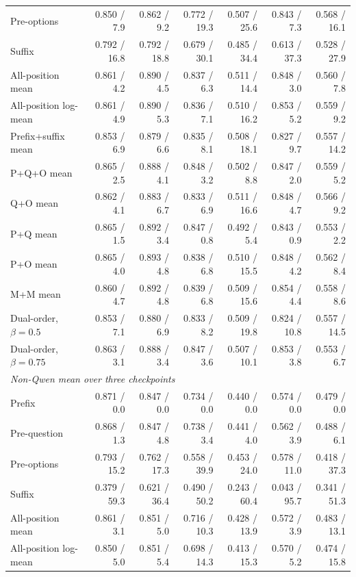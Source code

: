 \begin{tabular}{lrrrrrr}
Pre-options & 0.850 / 7.9 & 0.862 / 9.2 & 0.772 / 19.3 & 0.507 / 25.6 & 0.843 / 7.3 & 0.568 / 16.1 \\
Suffix & 0.792 / 16.8 & 0.792 / 18.8 & 0.679 / 30.1 & 0.485 / 34.4 & 0.613 / 37.3 & 0.528 / 27.9 \\
All-position mean & 0.861 / 4.2 & 0.890 / 4.5 & 0.837 / 6.3 & 0.511 / 14.4 & 0.848 / 3.0 & 0.560 / 7.8 \\
All-position log-mean & 0.861 / 4.9 & 0.890 / 5.3 & 0.836 / 7.1 & 0.510 / 16.2 & 0.853 / 5.2 & 0.559 / 9.2 \\
Prefix+suffix mean & 0.853 / 6.9 & 0.879 / 6.6 & 0.835 / 8.1 & 0.508 / 18.1 & 0.827 / 9.7 & 0.557 / 14.2 \\
P+Q+O mean & 0.865 / 2.5 & 0.888 / 4.1 & 0.848 / 3.2 & 0.502 / 8.8 & 0.847 / 2.0 & 0.559 / 5.2 \\
Q+O mean & 0.862 / 4.1 & 0.883 / 6.7 & 0.833 / 6.9 & 0.511 / 16.6 & 0.848 / 4.7 & 0.566 / 9.2 \\
P+Q mean & 0.865 / 1.5 & 0.892 / 3.4 & 0.847 / 0.8 & 0.492 / 5.4 & 0.843 / 0.9 & 0.553 / 2.2 \\
P+O mean & 0.865 / 4.0 & 0.893 / 4.8 & 0.838 / 6.8 & 0.510 / 15.5 & 0.848 / 4.2 & 0.562 / 8.4 \\
M+M mean & 0.860 / 4.7 & 0.892 / 4.8 & 0.839 / 6.8 & 0.509 / 15.6 & 0.854 / 4.4 & 0.558 / 8.6 \\
Dual-order, $\beta{=}0.5$ & 0.853 / 7.1 & 0.880 / 6.9 & 0.833 / 8.2 & 0.509 / 19.8 & 0.824 / 10.8 & 0.557 / 14.5 \\
Dual-order, $\beta{=}0.75$ & 0.863 / 3.1 & 0.888 / 3.4 & 0.847 / 3.6 & 0.507 / 10.1 & 0.853 / 3.8 & 0.553 / 6.7 \\
\midrule
\multicolumn{7}{l}{\textit{Non-Qwen mean over three checkpoints}} \\
Prefix & 0.871 / 0.0 & 0.847 / 0.0 & 0.734 / 0.0 & 0.440 / 0.0 & 0.574 / 0.0 & 0.479 / 0.0 \\
Pre-question & 0.868 / 1.3 & 0.847 / 4.8 & 0.738 / 3.4 & 0.441 / 4.0 & 0.562 / 3.9 & 0.488 / 6.1 \\
Pre-options & 0.793 / 15.2 & 0.762 / 17.3 & 0.558 / 39.9 & 0.453 / 24.0 & 0.578 / 11.0 & 0.418 / 37.3 \\
Suffix & 0.379 / 59.3 & 0.621 / 36.4 & 0.490 / 50.2 & 0.243 / 60.4 & 0.043 / 95.7 & 0.341 / 51.3 \\
All-position mean & 0.861 / 3.1 & 0.851 / 5.0 & 0.716 / 10.3 & 0.428 / 13.9 & 0.572 / 3.9 & 0.483 / 13.1 \\
All-position log-mean & 0.850 / 5.0 & 0.851 / 5.4 & 0.698 / 14.3 & 0.413 / 15.3 & 0.570 / 5.2 & 0.474 / 15.8 \\

\end{tabular}
